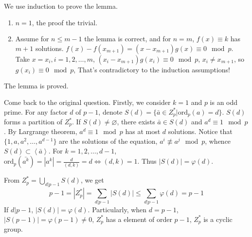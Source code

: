 \begin{answer}
    We use induction to prove the lemma.

    \begin{enumerate}
        \item $n=1$, the proof the trivial.
        \item Assume for $n\leq m-1$ the lemma is correct, and for $n= m$, $f(x)\equiv k$ has $m+1$ solutions. $f(x)-f(x_{m+1})=(x-x_{m+1})g(x)\equiv 0\mod p$. Take $x=x_{i}, i=1,2,\dots ,m$, $(x_{i}-x_{m+1})g(x_{i})\equiv 0\mod p$, $x_{i}\neq x_{m+1}$, so $g(x_{i})\equiv 0\mod p$, That's contradictory to the induction assumptions! 
    \end{enumerate}
    The lemma is proved.

    Come back to the original question. Firstly, we consider $k=1$ and $p$ is an odd prime. For any factor $d$ of $p-1$, denote $S(d)=\{\bar{a}\in Z_{p}^{*}|\mathrm{ord}_p(a)=d\}$. $S(d)$ forms a partition of $Z_{p}^{*}$. If $S(d)\neq \varnothing$, there exists $\bar{a}\in S(d)$ and $a^{d}\equiv 1\mod p$. By Largrange theorem, $a^{d}\equiv 1\mod p$ has at most $d$ solutions. Notice that $\{1,a,a^{2},\dots, a^{d-1}\}$ are the solutions of the equation, $a^{i}\not\equiv a^{j}\mod p$, whence $S(d)\subset\left\langle\bar{a}\right\rangle$. For $k=1,2,\dots,d-1$, $\mathrm{ord}_p(\bar{a^{k}})=\left| a^{k} \right| =\frac{d}{(d,k)}=d\Leftrightarrow(d,k)=1$. Thus $\left| S(d) \right| =\varphi(d)$.

    From $Z_{p}^{*}=\bigcup\limits_{d|p-1}S(d)$, we get \[p-1=\left| Z_{p}^{*} \right| =\sum\limits_{d|p-1}\left| S(d) \right| \leq \sum_{d|p-1}\varphi(d)=p-1\] If $d|p-1$, $\left| S(d) \right| =\varphi(d)$. Particularly, when $d=p-1$, $\left| S(p-1) \right| =\varphi(p-1)\neq 0$, $Z_{p}^{*}$ has a element of order $p-1$, $Z_{p}^{*}$ is a cyclic group.


\end{answer}
